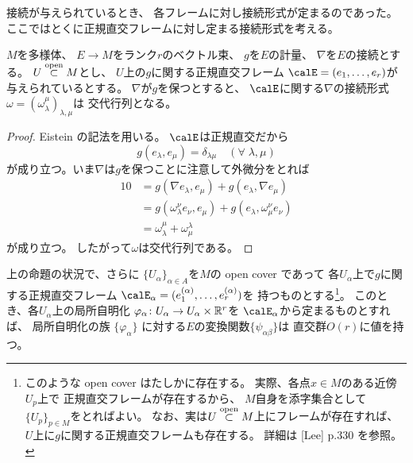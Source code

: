 \documentclass[report]{jlreq}
\begin{document}
接続が与えられているとき、
各フレームに対し接続形式が定まるのであった。
ここではとくに正規直交フレームに対し定まる接続形式を考える。

\begin{proposition}[正規直交フレームに関する接続形式]
    $M$を多様体、
    $E \to M$をランク$r$のベクトル束、
    $g$を$E$の計量、
    $\nabla$を$E$の接続とする。
    $U \stackrel{\text{open}}{\subset} M$とし、
    $U$上の$g$に関する正規直交フレーム
    $\calE = (e_1, \ldots, e_r)$が
    与えられているとする。
    $\nabla$が$g$を保つとすると、
    $\calE$に関する$\nabla$の接続形式
    $\omega = (\omega_\lambda^\mu)_{\lambda, \mu}$は
    交代行列となる。
\end{proposition}

\begin{proof}
    Eistein の記法を用いる。
    $\calE$は正規直交だから
    \begin{equation}
        g(e_\lambda, e_\mu) = \delta_{\lambda\mu}
            \quad (\forall \; \lambda, \mu)
    \end{equation}
    が成り立つ。いま$\nabla$は$g$を保つことに注意して外微分をとれば
    \begin{alignat}{1}
        0 &= g(\nabla e_\lambda, e_\mu) + g(e_\lambda, \nabla e_\mu) \\
            &= g(\omega_\lambda^\nu e_\nu, e_\mu) + g(e_\lambda, \omega_\mu^\nu e_\nu) \\
            &= \omega_\lambda^\mu + \omega_\mu^\lambda
    \end{alignat}
    が成り立つ。
    したがって$\omega$は交代行列である。
\end{proof}

\begin{proposition}[変換関数は直交群に値を持つ]
    上の命題の状況で、さらに
    $\{ U_\alpha \}_{\alpha \in A}$を$M$の open cover であって
    各$U_\alpha$上で$g$に関する正規直交フレーム
    $\calE_\alpha = (e^{(\alpha)}_1, \dots, e^{(\alpha)}_r)$を
    持つものとする\footnote{
        このような open cover はたしかに存在する。
        実際、各点$x \in M$のある近傍$U_p$上で
        正規直交フレームが存在するから、
        $M$自身を添字集合として$\{ U_p \}_{p \in M}$をとればよい。
        なお、実は$U \stackrel{\text{open}}{\subset} M$上にフレームが存在すれば、
        $U$上に$g$に関する正規直交フレームも存在する。
        詳細は [Lee] p.330 を参照。
    }。
    このとき、各$U_\alpha$上の局所自明化
    $\varphi_\alpha \colon U_\alpha \to U_\alpha \times \mathbb{R}^r$を
    $\calE_\alpha$から定まるものとすれば、
    局所自明化の族
    $\{ \varphi_\alpha \}$
    に対する$E$の変換関数$\{ \psi_{\alpha\beta} \}$は
    直交群$O(r)$に値を持つ。
\end{proposition}
\end{document}
